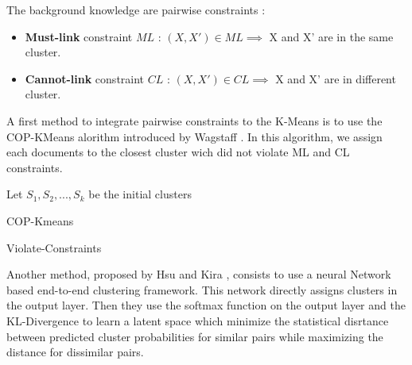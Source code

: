 The background knowledge are pairwise constraints :
\begin{itemize}
\item \textbf{Must-link} constraint $ML$ : $(X, X') \in ML \implies $ X and X' are in the
  same cluster.
\item \textbf{Cannot-link} constraint $CL$ : $(X, X') \in CL \implies $ X and X' are in
  different cluster.
\end{itemize}
A first method to integrate pairwise constraints to the K-Means is to use the
COP-KMeans alorithm introduced by Wagstaff
\cite{Wagstaff:2001:CKC:645530.655669}. In this algorithm, we assign each documents to the
closest cluster wich did not violate ML and CL constraints.\\
\begin{algorithm}[!h]
  Let $S_1, S_2 , ..., S_k$ be the initial clusters\\
  \caption{COP-Kmeans}
\end{algorithm}

\begin{algorithm}[!h]
  \caption{Violate-Constraints}
\end{algorithm}
Another method, proposed by Hsu and Kira \cite{2015arXiv151106321H}, consists to
use a neural Network based end-to-end clustering framework. This network
directly assigns clusters in the output layer. Then they use the softmax function
on the output layer and the KL-Divergence to learn a latent space which minimize
the statistical disrtance between predicted cluster probabilities for similar
pairs while maximizing the distance for dissimilar pairs.

